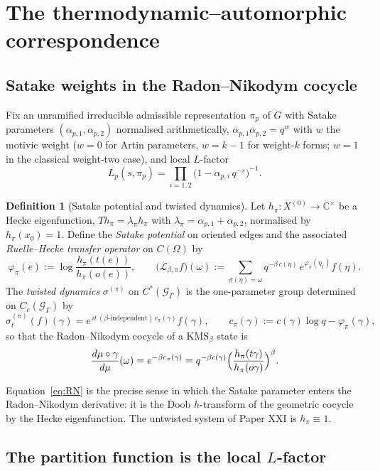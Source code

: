 \documentclass[11pt]{amsart}
\numberwithin{equation}{section}
\theoremstyle{definition}
\newtheorem{definition}[theorem]{Definition}
\theoremstyle{remark}
\newcommand{\C}{\mathbb{C}}
\newcommand{\cG}{\mathcal{G}}
\newcommand{\cL}{\mathcal{L}}
\newcommand{\KMS}{\mathrm{KMS}}
\begin{document}
\section{The thermodynamic--automorphic correspondence}\label{sec:thermo}

\subsection{Satake weights in the Radon--Nikodym cocycle}

Fix an unramified irreducible admissible representation $\pi_p$ of $G$ with Satake
parameters $(\alpha_{p,1},\alpha_{p,2})$ normalised arithmetically,
$\alpha_{p,1}\alpha_{p,2}=q^{w}$ with $w$ the motivic weight ($w=0$ for Artin
parameters, $w=k-1$ for weight-$k$ forms; $w=1$ in the classical weight-two case), and
local $L$-factor
\[
L_p(s,\pi_p)=\prod_{i=1,2}\bigl(1-\alpha_{p,i}\,q^{-s}\bigr)^{-1}.
\]

\begin{definition}[Satake potential and twisted dynamics]\label{def:dynamics}
Let $h_\pi\colon X^{(0)}\to\C^\times$ be a Hecke eigenfunction, $T h_\pi=\lambda_\pi h_\pi$
with $\lambda_\pi=\alpha_{p,1}+\alpha_{p,2}$, normalised by $h_\pi(x_0)=1$. Define the
\emph{Satake potential} on oriented edges and the associated \emph{Ruelle--Hecke transfer
operator} on $C(\Omega)$ by
\[
\varphi_\pi(e):=\log\frac{h_\pi(t(e))}{h_\pi(o(e))},\qquad
\bigl(\cL_{\beta,\pi}f\bigr)(\omega):=\sum_{\sigma(\eta)=\omega}
q^{-\beta\,c(\eta)}\,e^{\varphi_\pi(\eta_1)}f(\eta).
\]
The \emph{twisted dynamics} $\sigma^{(\pi)}$ on $C^*(\cG_\Gamma)$ is the one-parameter
group determined on $C_c(\cG_\Gamma)$ by
\[
\sigma^{(\pi)}_t(f)(\gamma)=e^{\,it\,(\beta\text{-independent})\,c_\pi(\gamma)}f(\gamma),
\qquad
c_\pi(\gamma):=c(\gamma)\log q-\varphi_\pi(\gamma),
\]
so that the Radon--Nikodym cocycle of a $\KMS_\beta$ state is
\begin{equation}\label{eq:RN}
\frac{d\mu\circ\gamma}{d\mu}(\omega)=e^{-\beta c_\pi(\gamma)}
=q^{-\beta c(\gamma)}\Bigl(\frac{h_\pi(t\gamma)}{h_\pi(o\gamma)}\Bigr)^{\beta}.
\end{equation}
\end{definition}

Equation~\eqref{eq:RN} is the precise sense in which the Satake parameter enters the
Radon--Nikodym derivative: it is the Doob $h$-transform of the geometric cocycle by the
Hecke eigenfunction. The untwisted system of Paper XXI is $h_\pi\equiv1$.

\subsection{The partition function is the local \texorpdfstring{$L$}{L}-factor}
\end{document}
